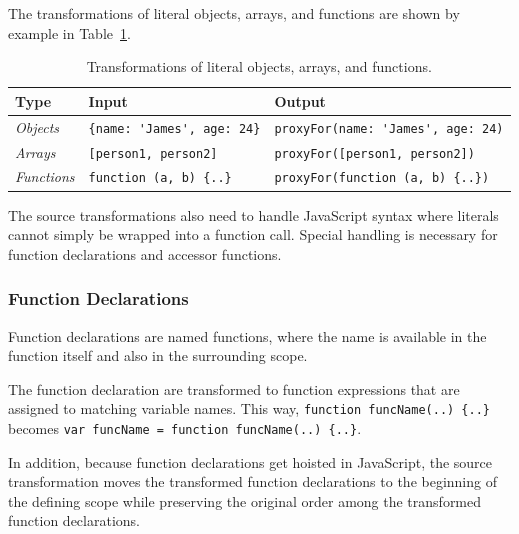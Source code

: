 The transformations of literal objects, arrays, and functions are shown by example in Table~\ref{table:literalTransforms}.

\begin{table}[h]
\begin{center}
\begin{tabular}{| l | l | l |}
\hline
Type & Input & Output \\ \hline
\emph{Objects} & \lstinline|{name: 'James', age: 24}| & \lstinline|proxyFor(name: 'James', age: 24)| \\ \hline
\emph{Arrays} & \lstinline|[person1, person2]| & \lstinline|proxyFor([person1, person2])| \\ \hline
\emph{Functions} & \lstinline|function (a, b) {..}| & \lstinline|proxyFor(function (a, b) {..})| \\ \hline
\end{tabular}
\end{center}
\caption[Table caption text]{Transformations of literal objects, arrays, and functions.}
\label{table:literalTransforms}
\end{table}

The source transformations also need to handle JavaScript syntax where literals cannot simply be wrapped into a function call.
Special handling is necessary for function declarations and accessor functions.


\subsubsection{Function Declarations}

Function declarations are named functions, where the name is available in the function itself and also in the surrounding scope.


The function declaration are transformed to function expressions that are assigned to matching variable names.
This way, \lstinline|function funcName(..) {..}| becomes \lstinline|var funcName = function funcName(..) {..}|.

In addition, because function declarations get hoisted in JavaScript, the source transformation moves the transformed function declarations to the beginning of the defining scope while preserving the original order among the transformed function declarations.


